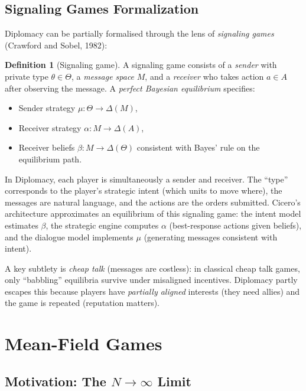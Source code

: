 \documentclass[11pt,a4paper]{article}
\theoremstyle{plain}
\theoremstyle{definition}
\newtheorem{definition}[theorem]{Definition}
\begin{document}
\subsection{Signaling Games Formalization}

Diplomacy can be partially formalised through the lens of \emph{signaling
games} (Crawford and Sobel, 1982):

\begin{definition}[Signaling game]
A signaling game consists of a \emph{sender} with private type
$\theta \in \Theta$, a \emph{message space} $M$, and a \emph{receiver}
who takes action $a \in A$ after observing the message.  A
\emph{perfect Bayesian equilibrium} specifies:
\begin{itemize}
  \item Sender strategy $\mu : \Theta \to \Delta(M)$,
  \item Receiver strategy $\alpha : M \to \Delta(A)$,
  \item Receiver beliefs $\beta : M \to \Delta(\Theta)$ consistent with
    Bayes' rule on the equilibrium path.
\end{itemize}
\end{definition}

In Diplomacy, each player is simultaneously a sender and receiver.  The
``type'' corresponds to the player's strategic intent (which units to move
where), the messages are natural language, and the actions are the orders
submitted.  Cicero's architecture approximates an equilibrium of this
signaling game: the intent model estimates $\beta$, the strategic engine
computes $\alpha$ (best-response actions given beliefs), and the dialogue
model implements $\mu$ (generating messages consistent with intent).

A key subtlety is \emph{cheap talk} (messages are costless): in classical
cheap talk games, only ``babbling'' equilibria survive under misaligned
incentives.  Diplomacy partly escapes this because players have
\emph{partially aligned} interests (they need allies) and the game is
repeated (reputation matters).

\section{Mean-Field Games}\label{sec:mfg}

\subsection{Motivation: The $N \to \infty$ Limit}
\end{document}
